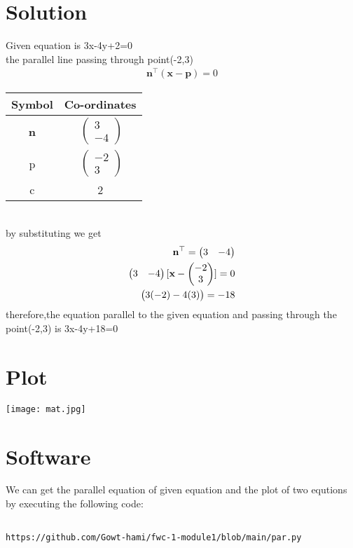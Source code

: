  \section{Solution}
 \begin{center}
 Given equation is 3x-4y+2=0
\\the parallel line passing through point(-2,3)
\begin{align}
\textbf{n}^{\top}(\textbf{x}-\textbf{p})=0 
\end{align}
\label{tab:truthtable}
    \setlength{\arrayrulewidth}{0.2mm}
\setlength{\tabcolsep}{5pt}
\renewcommand{\arraystretch}{1.25}
    \begin{tabular}{|c|c|}
    \hline %
      \large\textbf{Symbol} & \large\textbf{Co-ordinates} \\
      \hline
       \large \textbf{n} & $\ \begin{pmatrix} 3\\ -4 \end{pmatrix}$  \\
       \hline
       \large p & $\ \begin{pmatrix} -2\\ 3 \end{pmatrix}$ \\
       \hline
       	\large c & 2 \\
      \hline
   \end{tabular}
\\ by substituting we get
\begin{align}
\textbf{n}^{\top}=\begin{pmatrix}3&-4\end{pmatrix} \\
\begin{pmatrix}3&-4\end{pmatrix}[\textbf{x}-\begin{pmatrix}-2\\3\end{pmatrix}]=0
\\ \begin{pmatrix}3(-2)-4(3)\end{pmatrix}
=-18 
\end{align}
  therefore,the equation parallel to the given equation and passing through the point(-2,3) is 3x-4y+18=0
 \end{center}
 \section{Plot}
         \centering
        \texttt{[image: mat.jpg]}
  \section{Software}
  We can get the parallel equation of given equation and the plot of two equtions by executing the following code:
 \vspace{3mm} 
\begin{lstlisting}

https://github.com/Gowt-hami/fwc-1-module1/blob/main/par.py
\end{lstlisting}

